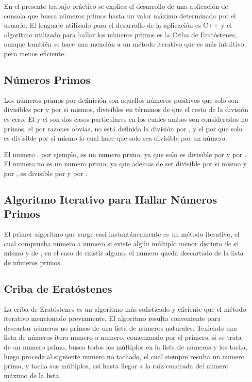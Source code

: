 \documentclass[12pt]{article}
\begin{document}
En el presente trabajo práctico se explica el desarrollo de una aplicación de
consola que busca números primos hasta un valor máximo determinado por el
usuario. El lenguaje utilizado para el desarrollo de la aplicación es C++ y el
algoritmo utilizado para hallar los números primos es la Criba de Eratóstenes,
aunque también se hace una mención a un método iterativo que es más intuitivo
pero menos eficiente.

\subsection{Números Primos}

Los números primos por definición son aquellos números positivos que solo son
divisibles por  y por si mismos, divisibles en términos de que el resto
de la división es cero. El  y el  son dos casos particulares en
los cuales ambos son considerados no primos, el  por razones obvias, no
está definida la división por , y el  por que solo es divisible
por si mismo lo cual hace que solo sea divisible por un número.

El numero , por ejemplo, es un numero primo, ya que solo es divisible
por  y por . El numero  no es un numero primo, ya que
ademas de ser divisible por si mismo y por , es divisible por  y
por .

\subsection{Algoritmo Iterativo para Hallar Números Primos}

El primer algoritmo que surge casi instantáneamente es un método iterativo, el
cual comprueba numero a numero si existe algún múltiplo menor distinto de si
mismo y de , en el caso de existir alguno, el numero queda descartado de
la lista de números primos.

\subsection{Criba de Eratóstenes}

La criba de Eratóstenes es un algoritmo más sofisticado y eficiente que el
método iterativo mencionado previamente. El algoritmo resulta conveniente para
descartar números no primos de una lista de números naturales. Teniendo una
lista de números itera numero a numero, comenzando por el primero, si se
trata de un numero primo, busca todos los múltiplos en la lista de números y
los tacha, luego procede al siguiente numero no tachado, el cual siempre
resulta un numero primo, y tacha sus múltiplos, así hasta llegar a la raíz
cuadrada del numero máximo de la lista.
\end{document}
